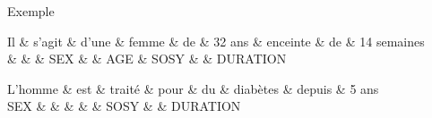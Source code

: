 \begin{frame}{Exemple}
    \centering
    \begin{adjustbox}{max width=\linewidth}
        \begin{dependency}[theme=simple]
            \begin{deptext}[row sep=.2em, column sep=.1em]
                Il \& s'agit \& d'une \& femme \& de \& 32 ans \& enceinte \& de \& 14 semaines \\
                \& \& \& SEX \& \& AGE \& SOSY \& \& DURATION \\
            \end{deptext}
        \end{dependency}
    \end{adjustbox}

    \vfill

    \begin{adjustbox}{max width=\linewidth}
        \begin{dependency}[theme=simple]
            \begin{deptext}[row sep=.2em, column sep=.1em]
                L'homme \& est \& traité \& pour \& du \& diabètes \& depuis \& 5 ans \\
                SEX \& \& \& \& \& SOSY \& \& DURATION \\
            \end{deptext}
        \end{dependency}
    \end{adjustbox}
\end{frame}

